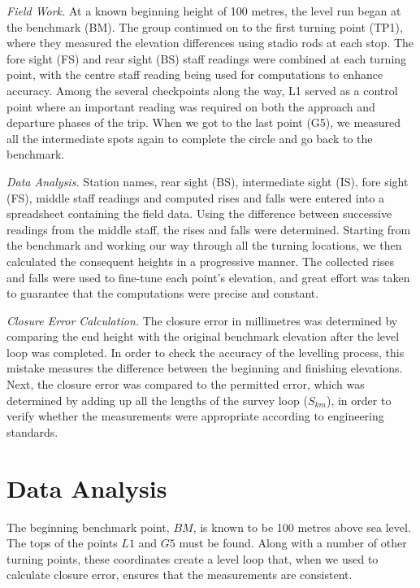 \documentclass[12pt]{report}
\begin{document}
\textit{Field Work.}
At a known beginning height of 100 metres, the level run began at the benchmark (BM). The group continued on to the first turning point (TP1), where they measured the elevation differences using stadio rods at each stop. The fore sight (FS) and rear sight (BS) staff readings were combined at each turning point, with the centre staff reading being used for computations to enhance accuracy. Among the several checkpoints along the way, L1 served as a control point where an important reading was required on both the approach and departure phases of the trip. When we got to the last point (G5), we measured all the intermediate spots again to complete the circle and go back to the benchmark.

\textit{Data Analysis.}
Station names, rear sight (BS), intermediate sight (IS), fore sight (FS), middle staff readings and computed rises and falls were entered into a spreadsheet containing the field data. Using the difference between successive readings from the middle staff, the rises and falls were determined. Starting from the benchmark and working our way through all the turning locations, we then calculated the consequent heights in a progressive manner. The collected rises and falls were used to fine-tune each point's elevation, and great effort was taken to guarantee that the computations were precise and constant.

\textit{Closure Error Calculation.}
The closure error in millimetres was determined by comparing the end height with the original benchmark elevation after the level loop was completed. In order to check the accuracy of the levelling process, this mistake measures the difference between the beginning and finishing elevations. Next, the closure error was compared to the permitted error, which was determined by adding up all the lengths of the survey loop (\(S_{km}\)), in order to verify whether the measurements were appropriate according to engineering standards.

\section*{Data Analysis}


The beginning benchmark point, \( BM \), is known to be 100 metres above sea level. The tops of the points \( L1 \) and \( G5 \) must be found. Along with a number of other turning points, these coordinates create a level loop that, when we used to calculate closure error, ensures that the measurements are consistent.
\end{document}
